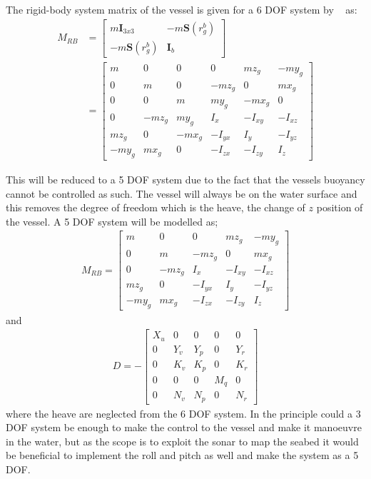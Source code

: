 The rigid-body system matrix of the vessel is given for a 6 \ac{DOF} system by ~\citep{fossen} as:
\begin{align}
M_{RB} &=
\begin{bmatrix}
m\boldsymbol{I}_{3x3} & -m\boldsymbol{S}(r^b_g)\\
-m\boldsymbol{S}(r^b_g) & \boldsymbol{I}_b
\end{bmatrix}
\nonumber\\
&=
\begin{bmatrix}
m & 0 & 0 & 0 & mz_g & -my_g\\
0 & m & 0 & -mz_g & 0 & mx_g\\
0 & 0 & m & my_g & -mx_g & 0\\
0 & -mz_g & my_g & I_x & -I_{xy} & -I_{xz}\\
mz_g & 0 & -mx_g & -I_{yx} & I_y & -I_{yz}\\
-my_g & mx_g & 0 & -I_{zx} & -I_{zy} & I_z
\end{bmatrix}
\end{align}

This will be reduced to a 5 \ac{DOF} system due to the fact that the
vessels buoyancy cannot be controlled as such. The vessel will always
be on the water surface and this removes the degree of freedom which
is the heave, the change of $z$ position of the vessel. A 5 \ac{DOF}
system will be modelled as;
\begin{align}
M_{RB} =
\begin{bmatrix}
m & 0 & 0 & mz_g & -my_g\\
0 & m & -mz_g & 0 & mx_g\\
0 & -mz_g & I_x & -I_{xy} & -I_{xz}\\
mz_g & 0 & -I_{yx} & I_y & -I_{yz}\\
-my_g & mx_g & -I_{zx} & -I_{zy} & I_z
\end{bmatrix}
\end{align}
and
\begin{align}
D = -
\begin{bmatrix}
X_u & 0 & 0 & 0 & 0\\
0 & Y_v & Y_p & 0 & Y_r\\
0 & K_v & K_p & 0 & K_r\\
0 & 0 & 0 & M_q & 0\\
0 & N_v & N_p & 0 & N_r
\end{bmatrix}
\label{eq:damping-matrix}
\end{align}
where the heave are neglected from the 6 \ac{DOF} system. In the principle could a 3 \ac{DOF} system be enough to make the control to the vessel and make it manoeuvre in the water, but as the scope is to exploit the sonar to map the seabed it would be beneficial to implement the roll and pitch as well and make the system as a 5 \ac{DOF}.

